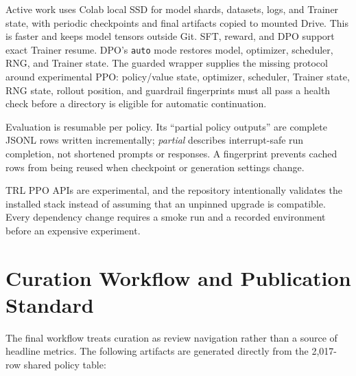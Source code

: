\documentclass[11pt]{article}
\begin{document}
Active work uses Colab local SSD for model shards, datasets, logs, and Trainer
state, with periodic checkpoints and final artifacts copied to mounted Drive.
This is faster and keeps model tensors outside Git. SFT, reward, and DPO
support exact Trainer resume. DPO's \texttt{auto} mode restores model,
optimizer, scheduler, RNG, and Trainer state. The guarded wrapper supplies the
missing protocol around experimental PPO: policy/value state, optimizer,
scheduler, Trainer state, RNG state, rollout position, and guardrail
fingerprints must all pass a health check before a directory is eligible for
automatic continuation.

Evaluation is resumable per policy. Its ``partial policy outputs'' are complete
JSONL rows written incrementally; \emph{partial} describes interrupt-safe run
completion, not shortened prompts or responses. A fingerprint prevents cached
rows from being reused when checkpoint or generation settings change.

TRL PPO APIs are experimental, and the repository intentionally validates the
installed stack instead of assuming that an unpinned upgrade is compatible.
Every dependency change requires a smoke run and a recorded environment before
an expensive experiment.

\section{Curation Workflow and Publication Standard}

The final workflow treats curation as review navigation rather than a source of
headline metrics. The following artifacts are generated directly from the
2,017-row shared policy table:
\end{document}
